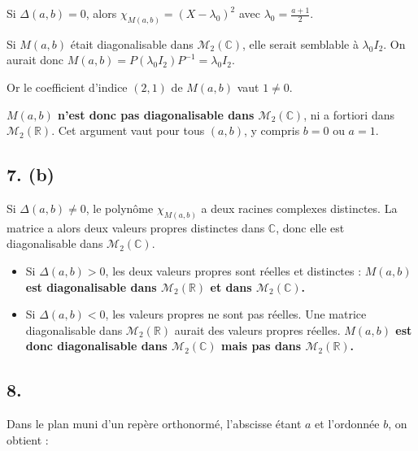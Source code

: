 \documentclass[11pt,a4paper]{article}
\providecommand{\tightlist}{\setlength{\itemsep}{0pt}\setlength{\parskip}{0pt}}
\begin{document}
Si \(\Delta(a,b)=0\), alors \(\chi_{M(a,b)}=(X-\lambda_0)^2\) avec \(\lambda_0=\frac{a+1}{2}\).

Si \(M(a,b)\) était diagonalisable dans \({\mathcal{M}}_2(\mathbb{C})\), elle serait semblable à \(\lambda_0I_2\). On aurait donc \(M(a,b)=P(\lambda_0I_2)P^{-1}=\lambda_0I_2\).

Or le coefficient d'indice \((2,1)\) de \(M(a,b)\) vaut \(1\neq0\).

\textbf{\(M(a,b)\) n'est donc pas diagonalisable dans \({\mathcal{M}}_2(\mathbb{C})\)}, ni a fortiori dans \({\mathcal{M}}_2(\mathbb{R})\). Cet argument vaut pour tous \((a,b)\), y compris \(b=0\) ou \(a=1\).

\hypertarget{b-1}{%
\subsection{7. (b)}\label{b-1}}

Si \(\Delta(a,b)\neq0\), le polynôme \(\chi_{M(a,b)}\) a deux racines complexes distinctes. La matrice a alors deux valeurs propres distinctes dans \(\mathbb{C}\), donc elle est diagonalisable dans \({\mathcal{M}}_2(\mathbb{C})\).

\begin{itemize}
\tightlist
\item
  Si \(\Delta(a,b)>0\), les deux valeurs propres sont réelles et distinctes : \textbf{\(M(a,b)\) est diagonalisable dans \({\mathcal{M}}_2(\mathbb{R})\) et dans \({\mathcal{M}}_2(\mathbb{C})\).}
\item
  Si \(\Delta(a,b)<0\), les valeurs propres ne sont pas réelles. Une matrice diagonalisable dans \({\mathcal{M}}_2(\mathbb{R})\) aurait des valeurs propres réelles. \textbf{\(M(a,b)\) est donc diagonalisable dans \({\mathcal{M}}_2(\mathbb{C})\) mais pas dans \({\mathcal{M}}_2(\mathbb{R})\).}
\end{itemize}

\hypertarget{section-5}{%
\subsection{8.}\label{section-5}}

Dans le plan muni d'un repère orthonormé, l'abscisse étant \(a\) et l'ordonnée \(b\), on obtient :
\end{document}
